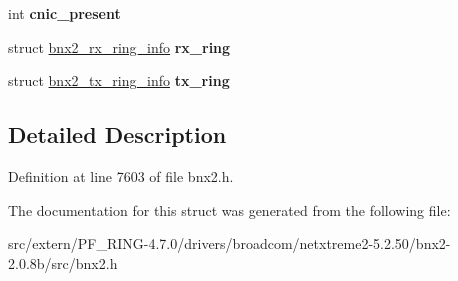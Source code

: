 \begin{DoxyCompactItemize}
\item 
\hypertarget{structbnx2__napi_ad4fa5a7a8beb155e2f0ff3f2d88e079a}{
int {\bfseries cnic\_\-present}}
\label{structbnx2__napi_ad4fa5a7a8beb155e2f0ff3f2d88e079a}

\item 
\hypertarget{structbnx2__napi_ae86d5b8957c4ad43afa1359dac76a089}{
struct \hyperlink{structbnx2__rx__ring__info}{bnx2\_\-rx\_\-ring\_\-info} {\bfseries rx\_\-ring}}
\label{structbnx2__napi_ae86d5b8957c4ad43afa1359dac76a089}

\item 
\hypertarget{structbnx2__napi_a985756f6235e5dca8f509f7b08c51dfa}{
struct \hyperlink{structbnx2__tx__ring__info}{bnx2\_\-tx\_\-ring\_\-info} {\bfseries tx\_\-ring}}
\label{structbnx2__napi_a985756f6235e5dca8f509f7b08c51dfa}

\end{DoxyCompactItemize}


\subsection{Detailed Description}


Definition at line 7603 of file bnx2.h.



The documentation for this struct was generated from the following file:\begin{DoxyCompactItemize}
\item 
src/extern/PF\_\-RING-\/4.7.0/drivers/broadcom/netxtreme2-\/5.2.50/bnx2-\/2.0.8b/src/bnx2.h\end{DoxyCompactItemize}
